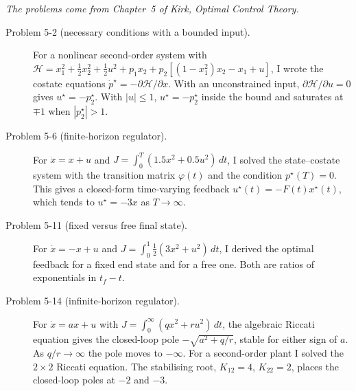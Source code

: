 


\noindent\textit{The problems come from Chapter~5 of Kirk, \emph{Optimal Control Theory}.}

\begin{description}
  \item[Problem 5-2 (necessary conditions with a bounded input).] For a nonlinear second-order system with $\mathcal{H}=x_1^2+\tfrac12x_2^2+\tfrac12u^2+p_1x_2+p_2[(1-x_1^2)x_2-x_1+u]$, I wrote the costate equations $\dot p^\star=-\partial\mathcal{H}/\partial x$. With an unconstrained input, $\partial\mathcal{H}/\partial u=0$ gives $u^\star=-p_2^\star$. With $|u|\le 1$, $u^\star=-p_2^\star$ inside the bound and saturates at $\mp1$ when $|p_2^\star|>1$.
  \item[Problem 5-6 (finite-horizon regulator).] For $\dot x=x+u$ and $J=\int_0^T(1.5x^2+0.5u^2)\,dt$, I solved the state--costate system with the transition matrix $\varphi(t)$ and the condition $p^\star(T)=0$. This gives a closed-form time-varying feedback $u^\star(t)=-F(t)x^\star(t)$, which tends to $u^\star=-3x$ as $T\to\infty$.
  \item[Problem 5-11 (fixed versus free final state).] For $\dot x=-x+u$ and $J=\int_0^1\tfrac12(3x^2+u^2)\,dt$, I derived the optimal feedback for a fixed end state and for a free one. Both are ratios of exponentials in $t_f-t$.
  \item[Problem 5-14 (infinite-horizon regulator).] For $\dot x=ax+u$ with $J=\int_0^\infty(qx^2+ru^2)\,dt$, the algebraic Riccati equation gives the closed-loop pole $-\sqrt{a^2+q/r}$, stable for either sign of $a$. As $q/r\to\infty$ the pole moves to $-\infty$. For a second-order plant I solved the $2\times2$ Riccati equation. The stabilising root, $K_{12}=4$, $K_{22}=2$, places the closed-loop poles at $-2$ and $-3$.
\end{description}

